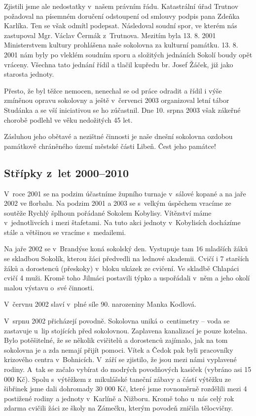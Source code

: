 \documentclass[a5paper, 12pt, twoside]{article}
\begin{document}
Zjistili jsme ale nedostatky v~našem právním řádu. Katastrální úřad
Trutnov požadoval na písemném doručení odstoupení od smlouvy podpis pana
Zdeňka Karlíka. Ten se však odmítl podepsat. Následoval soudní spor, ve
kterém nás zastupoval Mgr. Václav Čermák z~Trutnova. Mezitím byla 13. 8.
2001 Ministerstvem kultury prohlášena naše sokolovna za kulturní
památku. 13. 8. 2001 nám byly po vleklém soudním sporu a složitých
jednáních Sokolí boudy opět vráceny. Všechna tato jednání řídil a tlačil
kupředu br. Josef Žáček, již jako starosta jednoty.

Přesto, že byl těžce nemocen, nenechal se od práce odradit a řídil i
výše zmíněnou opravu sokolovny a ještě v~červenci 2003 organizoval letní
tábor Studánka a se vší iniciativou se ho zúčastnil. Dne 10. srpna 2003
však zákeřné chorobě podlehl ve věku nedožitých 45 let.

Zásluhou jeho obětavé a nezištné činnosti je naše dnešní sokolovna
ozdobou památkově chráněného území městské části Libeň. Čest jeho
památce!

\subsection{Střípky z~let
2000--2010}

V~roce 2001 se na podzim účastníme župního turnaje v~sálové kopané a na
jaře 2002 ve florbalu. Na podzim 2001 a 2003 se s~velkým úspěchem
vracíme ze soutěže Rychlý šplhoun pořádané Sokolem Kobylisy. Vítězství
máme v~jednotlivcích i mezi štafetami. Na tuto akci jednoty v~Kobylisích
docházíme stále a většinou se vracíme s~medailemi.

Na jaře 2002 se v~Brandýse koná sokolský den. Vystupuje tam 16 mladších
žáků se skladbou Sokolík, kterou žáci předvedli na lednové akademii.
Cvičí i 7 starších žáků a dorostenců (přeskoky) v~bloku ukázek ze
cvičení. Ve skladbě Chlapáci cvičí 4 muži. Kromě toho Jilmáci postavili
týpko a uspořádali v~něm a jeho okolí malou výstavu o~své činnosti.

V~červnu 2002 slaví v~plné síle 90. narozeniny Manka Kodlová.

V~srpnu 2002 přicházejí povodně. Sokolovna uniká o~centimetry -- voda se
zastavuje u~lip stojících před sokolovnou. Zaplavena kanalizací je pouze
kotelna. Bylo potěšitelné, že se několik cvičitelů a dorostenců
zajímalo, jak na tom sokolovna je a zda nemají přijít pomoci. Vítek a
Čedok pak byli pracovníky krizového centra v~Bohnicích. V~září se
zjistilo, že jsou mezi námi vyplavené rodiny. A~tak se začalo vybírat do
modrých povodňových kasiček (vybráno asi 15 000 Kč). Spolu s~výtěžkem
z~mikulášské taneční zábavy a částí výtěžku ze šibřinek jsme dali
dohromady 30 000 Kč, které jsme rovnoměrně rozdělili mezi 4 postižené
rodiny a jednoty v~Karlíně a Nižboru. Kromě toho u~nás celý rok zdarma
cvičili žáci ze školy na Zámečku, kterým povodeň zničila tělocvičny.
\end{document}
